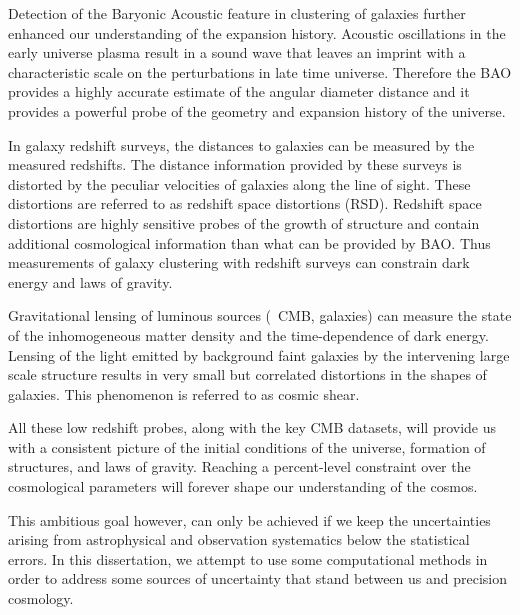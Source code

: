
Detection of the Baryonic Acoustic feature in clustering of galaxies further enhanced 
our understanding of the expansion history. Acoustic oscillations in the early universe plasma 
result in a sound wave that leaves an imprint with a characteristic scale on the perturbations 
in late time universe. Therefore the BAO provides a highly accurate estimate of the angular diameter 
distance and it provides a powerful probe of the geometry and expansion history of the universe. 

In galaxy redshift surveys, the distances to galaxies can be measured by the measured 
redshifts. The distance information provided by these surveys is distorted by the peculiar 
velocities of galaxies along the line of sight. These distortions are referred to as redshift space 
distortions (RSD). Redshift space distortions are highly sensitive probes of the growth of structure 
and contain additional cosmological information than what can be provided by BAO. Thus measurements of 
galaxy clustering with redshift surveys can constrain dark energy and laws of gravity.

Gravitational lensing of luminous sources (\eg\ CMB, galaxies) can measure 
the state of the inhomogeneous matter density and the time-dependence of dark energy. 
Lensing of the light emitted by background faint galaxies by the intervening large scale structure 
results in very small but correlated distortions in the shapes of galaxies. This phenomenon is referred to 
as cosmic shear.

All these low redshift probes, along with the key CMB datasets, will provide us 
with a consistent picture of the initial conditions of the universe, formation of structures, and laws of 
gravity. Reaching a percent-level constraint over the cosmological parameters will forever shape 
our understanding of the cosmos. 

This ambitious goal however, can only be achieved if we keep the 
uncertainties arising from astrophysical and observation systematics 
below the statistical errors. In this dissertation, we attempt to use some 
computational methods in order to address some sources of uncertainty that stand 
between us and precision cosmology. 
 

